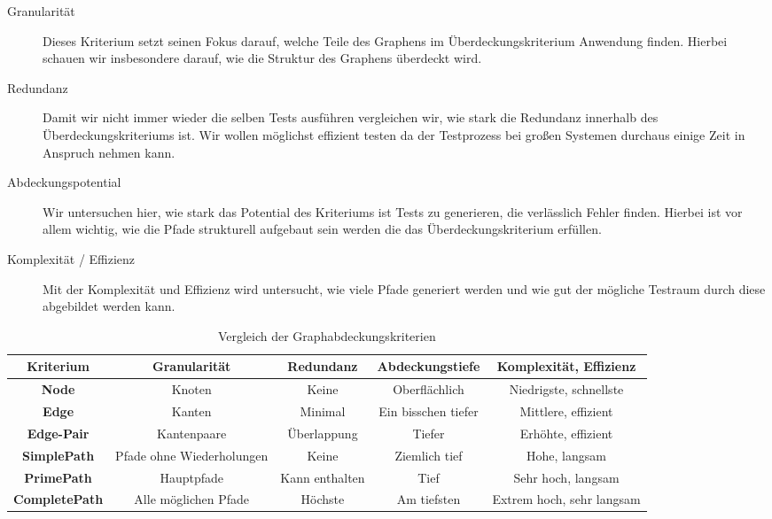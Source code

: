 \begin{description}
    \item[Granularität] Dieses Kriterium setzt seinen Fokus darauf, welche Teile des Graphens im Überdeckungskriterium Anwendung finden.
    Hierbei schauen wir insbesondere darauf, wie die Struktur des Graphens überdeckt wird.

    \item[Redundanz] Damit wir nicht immer wieder die selben Tests ausführen vergleichen wir, wie stark die Redundanz innerhalb
    des Überdeckungskriteriums ist. Wir wollen möglichst effizient testen da der Testprozess bei großen Systemen
    durchaus einige Zeit in Anspruch nehmen kann.
    \item[Abdeckungspotential] Wir untersuchen hier, wie stark das Potential des Kriteriums ist Tests zu generieren, die verlässlich Fehler finden.
    Hierbei ist vor allem wichtig, wie die Pfade strukturell aufgebaut sein werden die das Überdeckungskriterium erfüllen.

    \item[Komplexität / Effizienz] Mit der Komplexität und Effizienz wird untersucht, wie viele Pfade generiert werden und wie gut der mögliche Testraum durch diese
    abgebildet werden kann.
\end{description}

\begin{center}
    \begin{table}[!ht]
        \begin{tabularx}{\textwidth}{|c|c|c|c|c|}
            \hline
            \textbf{Kriterium} & \textbf{Granularität} & \textbf{Redundanz} & \textbf{Abdeckungstiefe} & \textbf{Komplexität, Effizienz}\\
            \hline
            \textbf{Node} & Knoten & Keine & Oberflächlich & Niedrigste, schnellste\\
            \hline
            \textbf{Edge} & Kanten & Minimal & Ein bisschen tiefer & Mittlere, effizient\\
            \hline
            \textbf{Edge-Pair} & Kantenpaare & Überlappung & Tiefer & Erhöhte, effizient\\
            \hline
            \textbf{SimplePath} & Pfade ohne Wiederholungen & Keine & Ziemlich tief & Hohe, langsam\\
            \hline
            \textbf{PrimePath} & Hauptpfade & Kann enthalten & Tief & Sehr hoch, langsam\\
            \hline
            \textbf{CompletePath} & Alle möglichen Pfade & Höchste & Am tiefsten & Extrem hoch, sehr langsam\\
            \hline
        \end{tabularx}
        \caption{Vergleich der Graphabdeckungskriterien}
    \end{table}
\end{center}

